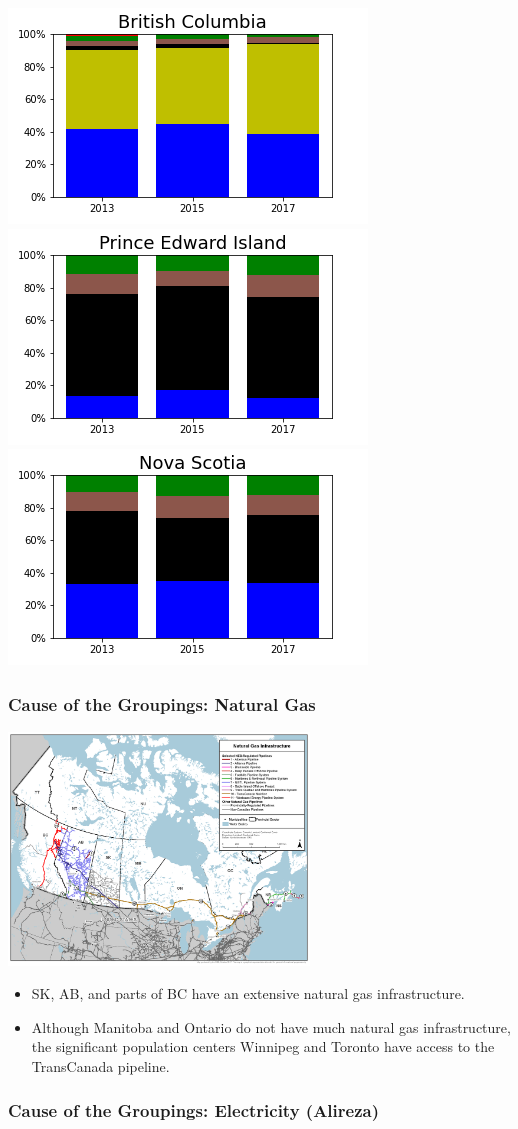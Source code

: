 \documentclass{beamer}
\begin{document}
\begin{frame}
\includegraphics[width=0.25\linewidth]{bc.png}%
\includegraphics[width=0.25\linewidth]{pe.png}%
\includegraphics[width=0.25\linewidth]{ns.png}


\end{frame}


\begin{frame}

\frametitle{Cause of the Groupings: Natural Gas}
\includegraphics[width=0.6\textwidth]{natural_gas_pipeline_natural_resources_canada}
\small
\begin{itemize}
	\item SK, AB, and parts of BC have an extensive natural gas infrastructure.
	\item Although Manitoba and Ontario do not have much natural gas infrastructure, the significant population centers Winnipeg and Toronto have access to the TransCanada pipeline.
\end{itemize}
\normalsize
\end{frame}


\begin{frame}
\frametitle{Cause of the Groupings: Electricity (Alireza)}

\end{frame}
\end{document}
